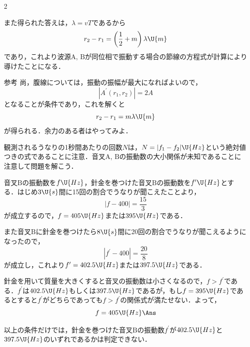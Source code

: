 \begin{multicols}{2}
\begin{chuu}
また得られた答えは，$\lambda=vT$であるから
\[r_2-r_1=\left(\frac{1}{2}+m\right)\lambda\U{m}\]
であり，これより波源$\mathrm{A}$, $\mathrm{B}$が同位相で振動する場合の節線の方程式が計算により導けたことになる．
\end{chuu}
\begin{bsHosoku}{参考}
尚，腹線については，振動の振幅が最大になればよいので，
\[|A^\prime(r_1,r_2)|=2A\]
となることが条件であり，これを解くと
\[r_2-r_1=m\lambda\U{m}\]
が得られる．余力のある者はやってみよ．
\end{bsHosoku}

\par\nopagebreak
\begin{sisin}
観測されるうなりの1秒間あたりの回数$N$は，$N=|f_1-f_2|\U{Hz}$という絶対値つきの式であることに注意．音叉$\mathrm{A}$, $\mathrm{B}$の振動数の大小関係が未知であることに注意して問題を解こう．
\end{sisin}
\KaiHead
\hspace{1zw}音叉$\mathrm{B}$の振動数を$f\U{Hz}$，針金を巻つけた音叉$\mathrm{B}$の振動数を$f^\prime\U{Hz}$とする．はじめ$3\U{s}$間に15回の割合でうなりが聞こえたことより，
\[|f-400|=\frac{15}{3}\]
が成立するので，$f=405\U{Hz}$または$395\U{Hz}$である．

\hspace{1zw}また音叉$\mathrm{B}$に針金を巻つけたら$8\U{s}$間に20回の割合でうなりが聞こえるようになったので，
\[|f^\prime-400|=\frac{20}{8}\]
が成立し，これより$f^\prime=402.5\U{Hz}$または$397.5\U{Hz}$である．

\hspace{1zw}針金を用いて質量を大きくすると音叉の振動数は小さくなるので，$f>f^\prime$である．$f^\prime$は$402.5\U{Hz}$もしくは$397.5\U{Hz}$であるが，もし$f=395\U{Hz}$であるとすると$f^\prime$がどちらであっても$f>f^\prime$の関係式が満たせない．よって，
\[f=405\U{Hz}\Ans\]
\begin{chuu}
以上の条件だけでは，針金を巻つけた音叉$\mathrm{B}$の振動数$f^\prime$が$402.5\U{Hz}$と$397.5\U{Hz}$のいずれであるかは判定できない．
\end{chuu}


\end{multicols}
